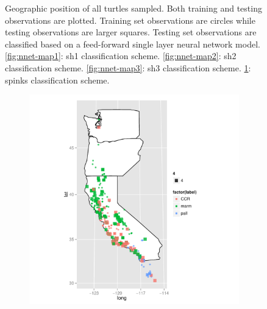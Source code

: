 \documentclass{article}\usepackage{graphicx, color}
\begin{document}
\begin{figure}[t]
\begin{subfigure}[b]{0.5\textwidth}
    \label{fig:nnet-map4}
  \end{subfigure}
  \caption{Geographic position of all turtles sampled. Both training and testing observations are plotted. Training set observations are circles while testing observations are larger squares. Testing set observations are classified based on a feed-forward single layer neural network model. \ref{fig:nnet-map1}: sh1 classification scheme. \ref{fig:nnet-map2}: sh2 classification scheme. \ref{fig:nnet-map3}: sh3 classification scheme. \ref{fig:nnet-map4}: spinks classification scheme.}
  \label{fig:nnet-map}
\end{figure}





\begin{figure}[t]
  \centering
  \begin{subfigure}[b]{0.5\textwidth}
    \centering
    \caption{}
    \includegraphics[width = \textwidth]{figure/rf-map1}
    \label{fig:rf-map1}
  \end{subfigure}%
  \begin{subfigure}[b]{0.5\textwidth}
    \centering
    \caption{}

\end{subfigure}
\end{figure}
\end{document}
